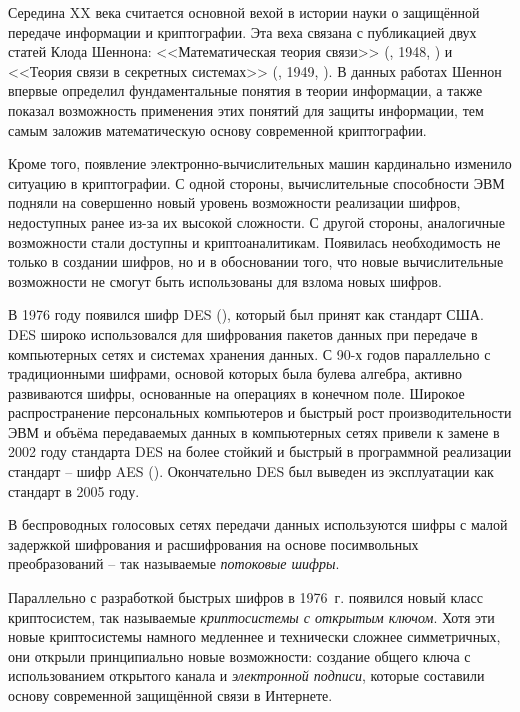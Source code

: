 Середина XX века считается основной вехой в истории науки о защищённой передаче информации и криптографии. Эта веха связана с публикацией двух статей Клода Шеннона: <<Математическая теория связи>> (, 1948, \cite{Shannon:1948:MTCa, Shannon:1948:MTCb}) и <<Теория связи в секретных системах>> (, 1949, \cite{Shannon:1949:CTS}). В данных работах Шеннон впервые определил фундаментальные понятия в теории информации, а также показал возможность применения этих понятий для защиты информации, тем самым заложив математическую основу современной криптографии.

Кроме того, появление электронно-вычислительных машин кардинально изменило ситуацию в криптографии. С одной стороны, вычислительные способности ЭВМ подняли на совершенно новый уровень возможности реализации шифров, недоступных ранее из-за их высокой сложности. С другой стороны, аналогичные возможности стали доступны и криптоаналитикам. Появилась необходимость не только в создании шифров, но и в обосновании того, что новые вычислительные возможности не смогут быть использованы для взлома новых шифров.

В 1976 году появился шифр DES (), который был принят как стандарт США. DES широко использовался для шифрования пакетов данных при передаче в компьютерных сетях и системах хранения данных. С 90-х годов параллельно с традиционными шифрами, основой которых была булева алгебра, активно развиваются шифры, основанные на операциях в конечном поле. Широкое распространение персональных компьютеров и быстрый рост производительности ЭВМ и объёма передаваемых данных в компьютерных сетях привели к замене в 2002 году стандарта DES на более стойкий и быстрый в программной реализации стандарт -- шифр AES (). Окончательно DES был выведен из эксплуатации как стандарт в 2005 году.

В беспроводных голосовых сетях передачи данных используются шифры с малой задержкой шифрования и расшифрования на основе посимвольных преобразований -- так называемые \emph{потоковые шифры}.

Параллельно с разработкой быстрых шифров в 1976~г. появился новый класс криптосистем, так называемые \emph{криптосистемы с открытым ключом}. Хотя эти новые криптосистемы намного медленнее и технически сложнее симметричных, они открыли принципиально новые возможности: создание общего ключа с использованием открытого канала и \emph{электронной подписи}, которые составили основу современной защищённой связи в Интернете.

